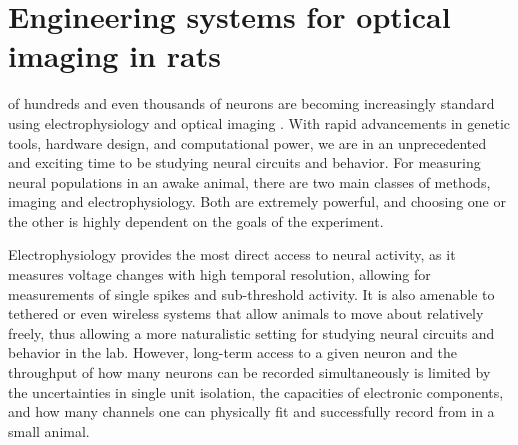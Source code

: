 


\chapter{Engineering systems for optical imaging in rats}
 of hundreds and even thousands of neurons are becoming increasingly standard using electrophysiology \cite{Steinmetz2019, Siegle2021, Stringer2019SpontaneousActivity} and optical imaging \cite{Stringer2019High-dimensionalCortex, Weisenburger2019, Sofroniew2016}. With rapid advancements in genetic tools, hardware design, and computational power, we are in an unprecedented and exciting time to be studying neural circuits and behavior. For measuring neural populations in an awake animal, there are two main classes of methods, imaging and electrophysiology. Both are extremely powerful, and choosing one or the other is highly dependent on the goals of the experiment. 

Electrophysiology provides the most direct access to neural activity, as it measures voltage changes with high temporal resolution, allowing for measurements of single spikes and sub-threshold activity. It is also amenable to tethered or even wireless systems that allow animals to move about relatively freely, thus allowing a more naturalistic setting for studying neural circuits and behavior in the lab. However, long-term access to a given neuron and the throughput of how many neurons can be recorded simultaneously is limited by the uncertainties in single unit isolation, the capacities of electronic components, and how many channels one can physically fit and successfully record from in a small animal. 

